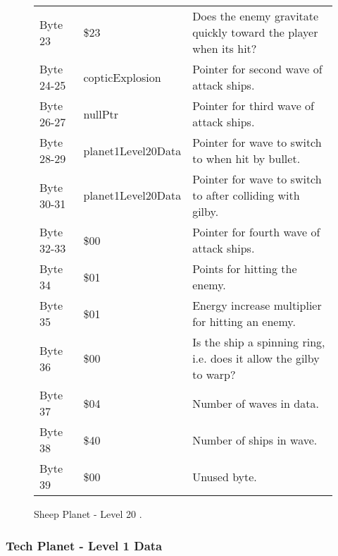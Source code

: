 \begin{figure}[H]
{\begin{adjustbox}{width=12cm}
\begin{tabular}{lll}
 Byte 23    & \$23                & Does the enemy gravitate quickly toward the player when its hit?    \\
 Byte 24-25 & copticExplosion    & Pointer for second wave of attack ships.                            \\
 Byte 26-27 & nullPtr            & Pointer for third wave of attack ships.                             \\
 Byte 28-29 & planet1Level20Data & Pointer for wave to switch to when hit by bullet.                   \\
 Byte 30-31 & planet1Level20Data & Pointer for  wave to switch to after colliding with gilby.          \\
 Byte 32-33 & \$00                & Pointer for fourth wave of attack ships.                            \\
 Byte 34    & \$01                & Points for hitting the enemy.                                       \\
 Byte 35    & \$01                & Energy increase multiplier for hitting an enemy.                    \\
 Byte 36    & \$00                & Is the ship a spinning ring, i.e. does it allow the gilby to warp?  \\
 Byte 37    & \$04                & Number of waves in data.                                            \\
 Byte 38    & \$40                & Number of ships in wave.                                            \\
 Byte 39    & \$00                & Unused byte.                                                        \\
\bottomrule
\end{tabular}

  \end{adjustbox}

  }\caption*{Sheep Planet - Level 20
.}
\end{figure}

\clearpage
\subsubsection{Tech Planet - Level 1 Data}

